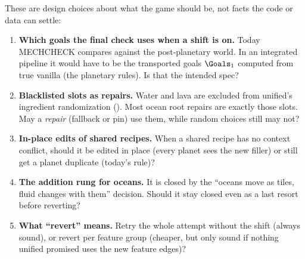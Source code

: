 These are design choices about what the game should be, not facts the code or data can settle:
\begin{enumerate}[label=Q\arabic*.]
\item \textbf{Which goals the final check uses when a shift is on.} Today MECHCHECK compares against the post-planetary world. In an integrated pipeline it would have to be the transported goals $\Goals_1$ computed from true vanilla (the planetary rules). Is that the intended spec?
\item \textbf{Blacklisted slots as repairs.} Water and lava are excluded from unified's ingredient randomization (). Most ocean root repairs are exactly those slots. May a \emph{repair} (fallback or pin) use them, while random choices still may not?
\item \textbf{In-place edits of shared recipes.} When a shared recipe has no context conflict, should it be edited in place (every planet sees the new filler) or still get a planet duplicate (today's rule)?
\item \textbf{The addition rung for oceans.} It is closed by the ``oceans move as tiles, fluid changes with them'' decision. Should it stay closed even as a last resort before reverting?
\item \textbf{What ``revert'' means.} Retry the whole attempt without the shift (always sound), or revert per feature group (cheaper, but only sound if nothing unified promised uses the new feature edges)?
\end{enumerate}
